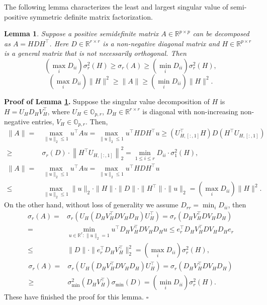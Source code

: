 \documentclass[11pt]{article}
\newtheorem{Lemma}{Lemma}
\newcommand{\0}{{\mathbf{0}}}
\newcommand{\1}{{\mathbf{1}}}
\begin{document}
The following lemma characterizes the least and largest singular value of semi-positive symmetric definite matrix factorization.
\begin{Lemma}\label{lm:algebra-least-singular-value}
	Suppose a positive semidefinite matrix $A \in \mathbb{R}^{p\times p}$ can be decomposed as $A = HDH^\top$. Here $D\in \mathbb{R}^{r\times r}$ is a non-negative diagonal matrix and $H\in \mathbb{R}^{p\times r}$ is a general matrix that is not necessarily orthogonal. Then
	$$\left(\max_i D_{ii}\right)\sigma_r^2(H) \geq \sigma_r(A)\geq \left(\min_i D_{ii}\right)\sigma_r^2(H),$$
	$$\left(\max_{i}D_{ii}\right)\|H\|^2 \geq \|A\| \geq \left(\min_{i}D_{ii}\right)\|H\|^2.$$
\end{Lemma}
{\bf\noindent Proof of Lemma \ref{lm:algebra-least-singular-value}.} Suppose the singular value decomposition of $H$ is $H = U_H D_H V_H^\top$, where $U_H\in \mathbb{O}_{p, r}$, $D_H\in \mathbb{R}^{r\times r}$ is diagonal with non-increasing non-negative entries, $V_H\in \mathbb{O}_{p, r}$. Then, 
\begin{equation*}
\begin{split}
\|A\| =&  \max_{\|u\|_2\leq 1} u^\top Au = \max_{\|u\|_2\leq 1} u^\top HDH^\top u \geq \left(U_{H, [:, 1]}^\top H\right) D \left(H^\top U_{H, [:, 1]}\right) \\
\geq & \sigma_r(D) \cdot \left\|H^\top U_{H, [:, 1]}\right\|_2^2 = \min_{1\leq i \leq r} D_{ii} \cdot \sigma_1^2(H),
\end{split}
\end{equation*}
\begin{equation*}
\begin{split}
\|A\| = & \max_{\|u\|_2\leq 1}u^\top A u = \max_{\|u\|_2\leq 1}u^\top HDH^\top u \\
\leq & \max_{\|u\|_2\leq 1}\|u\|_2 \cdot\|H\|\cdot\|D\|\cdot\|H^\top\| \cdot\|u\|_2 = \left(\max_{i}D_{ii}\right) \|H\|^2.
\end{split}
\end{equation*}
On the other hand, without loss of generality we assume $D_{rr} = \min_i D_{ii}$, then
\begin{equation*}
\begin{split}
\sigma_r(A) = & \sigma_r\left(U_H\left(D_HV_H^\top DV_HD_H\right)U_H^\top\right) = \sigma_r\left(D_HV_H^\top DV_HD_H\right)\\
= & \min_{u\in \mathbb{R}^r: \|u\|_2= 1} u^\top D_HV_H^\top DV_HD_H u \leq e_r^\top D_H V_H^\top D V_H D_H e_r \\
\leq & \|D\|\cdot \|e_r^\top D_H V_H^\top\|_2^2 = \left(\max_i D_{ii}\right)\sigma_r^2(H),
\end{split}
\end{equation*}
\begin{equation*}
\begin{split}
\sigma_r(A) = & \sigma_r\left(U_H\left(D_HV_H^\top DV_HD_H\right)U_H^\top\right) = \sigma_r\left(D_HV_H^\top DV_HD_H\right)\\
\geq &  \sigma_{\min}^2(D_HV_H^\top)\sigma_{\min}(D) = \left(\min_{i}D_{ii}\right)\sigma_r^2(H).
\end{split}
\end{equation*}
These have finished the proof for this lemma. \quad $\square$
\end{document}
